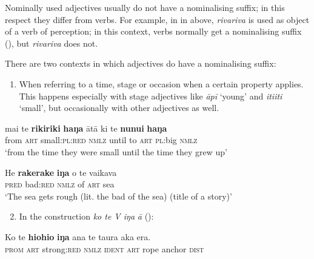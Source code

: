 Nominally used adjectives usually do not have a nominalising suffix; in this respect they differ from verbs. For example, in  in  above, \textit{rivariva} is used as object of a verb of perception; in this context, verbs normally get a nominalising suffix (), but \textit{rivariva} does not.

There are two contexts in which adjectives do have a nominalising suffix:

\begin{enumerate}
\item 
When referring to a time, stage or occasion when a certain property applies. This happens especially with stage adjectives like \textit{{\ꞌ}āpī} ‘young’ and \textit{{\ꞌ}iti{\ꞌ}iti} ‘small’, but occasionally with other adjectives as well.

\end{enumerate}

\ea\label{ex:3.109}
\gll mai te \textbf{rikiriki} \textbf{haŋa} {\ꞌ}ātā ki te \textbf{nunui} \textbf{haŋa}\\
from \textsc{art} small:\textsc{pl}:\textsc{red} \textsc{nmlz} until to \textsc{art} \textsc{pl}:big \textsc{nmlz}\\

\glt 
‘from the time they were small until the time they grew up’ \textstyleExampleref{[R236.097]} 
\z

\ea\label{ex:3.110}
\gll He \textbf{rakerake} \textbf{iŋa} o te vaikava\\
\textsc{pred} bad:\textsc{red} \textsc{nmlz} of \textsc{art} sea\\

\glt
‘The sea gets rough (lit. the bad of the sea) (title of a story)’ \textstyleExampleref{[Acts 27:12]}
\z

\begin{enumerate}
\setcounter{enumi}{1}
\item 
In the construction \textit{ko te V iŋa} \textit{\textsf{{\ꞌ}}}\textit{ā} ():

\end{enumerate}

\ea\label{ex:3.111}
\gll Ko te \textbf{hiohio} \textbf{iŋa} {\ꞌ}ana te taura {\ꞌ}aka era.\\
\textsc{prom} \textsc{art} strong:\textsc{red} \textsc{nmlz} \textsc{ident} \textsc{art} rope anchor \textsc{dist}\\


